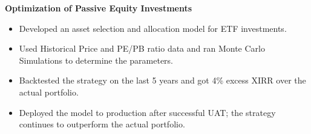 \textbf{Optimization of Passive Equity Investments}
\begin{itemize}
    \item Developed an asset selection and allocation model for ETF investments.
    \item Used Historical Price and PE/PB ratio data and ran Monte Carlo Simulations to determine the parameters.
    \item Backtested the strategy on the last 5 years and got 4\% excess XIRR over the actual portfolio.
    \item Deployed the model to production after successful UAT; the strategy continues to outperform the actual portfolio.
\end{itemize}
